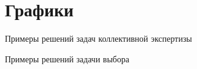  
\section{Графики}
\begin{frame}{Примеры решений задач коллективной экспертизы}
 \begin{center}

 \end{center}
\end{frame} %

\begin{frame}{Примеры решений задачи выбора}
 \begin{center}

 \end{center}
\end{frame} %
